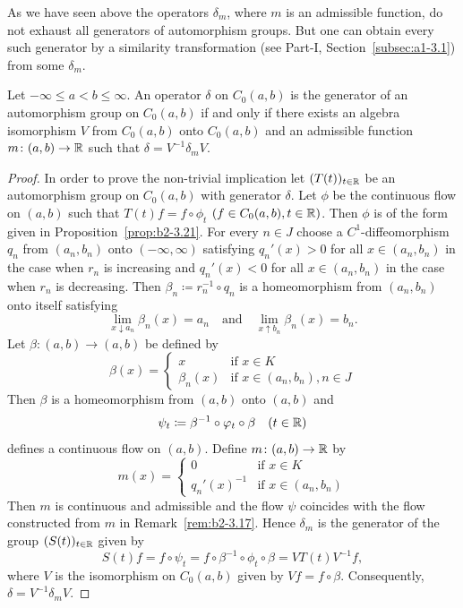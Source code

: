 As we have seen above the operators $\delta_{m}$, where $m$ is an admissible function, do not exhaust all generators of automorphism groups.
But one can obtain every such generator by a similarity transformation (see Part-I, Section~\ref{subsec:a1-3.1}) from some $\delta_{m}$.
\begin{theorem}\label{thm:b2-3.24}
%
Let $-\infty \leq a < b \leq \infty$.
An operator $\delta$ on $C_{0}(a,b)$ is the generator of an automorphism group on $C_{0}(a,b)$ if and only if there exists an algebra isomorphism $V$ from $C_{0}(a,b)$ onto $C_{0}(a,b)$ and an admissible function $m \colon (a,b) \to \mathbb{R}$ such that $\delta = V^{-1}\delta_{m}V$.
\end{theorem}
\begin{proof}
In order to prove the non-trivial implication let $(T(t))_{t \in \mathbb{R}}$ be an automorphism group on $C_{0}(a,b)$ with generator $\delta$.
Let $\phi$ be the continuous flow on $(a,b)$ such that $T(t)f = f \circ \phi_{t}$ $(f \in C_{0}(a,b), t \in \mathbb{R})$.
Then $\phi$ is of the form given in Proposition~\ref{prop:b2-3.21}.
For every $n \in J$ choose a $C^{1}$-diffeomorphism $q_{n}$ from $(a_{n},b_{n})$ onto $(-\infty,\infty)$ satisfying $q_{n}'(x) > 0$ for all $x \in (a_{n},b_{n})$ in the case when $r_{n}$ is increasing and $q_{n}'(x) < 0$ for all $x \in (a_{n},b_{n})$ in the case when $r_{n}$ is decreasing.
Then $\beta_{n} \coloneq r_{n}^{-1} \circ q_{n}$ is a homeomorphism from $(a_{n},b_{n})$ onto itself satisfying 
%
\[
	\lim_{x \downarrow a_{n}}\beta_{n}(x) = a_{n} \quad \text{and} \quad 
	\lim_{x \uparrow b_{n}}\beta_{n}(x) = b_{n} . 
\]
%
Let $\beta \colon (a,b) \to (a,b)$ be defined by
\begin{equation*}\label{eq:b2-beta}
\beta(x) = \begin{cases}
    x & \text{if } x \in K \\
    \beta_{n}(x) & \text{if } x \in (a_{n},b_{n}), n \in J
\end{cases}
\end{equation*}
Then $\beta$ is a homeomorphism from $(a,b)$ onto $(a,b)$ and 
\[
	\psi_{t} \coloneq \beta^{-1} \circ \phi_{t} \circ \beta \quad (t \in \R)
\]
%
defines a continuous flow on $(a,b)$.
Define $m \colon (a,b) \to \mathbb{R}$ by
\begin{equation*}\label{eq:b2-m-def2}
m(x) = \begin{cases}
    0 & \text{if } x \in K \\
    q_{n}'(x)^{-1} & \text{if } x \in (a_{n},b_{n})
\end{cases}
\end{equation*}
Then $m$ is continuous and admissible and the flow $\psi$ coincides with the flow constructed from $m$ in Remark~\ref{rem:b2-3.17}.
Hence $\delta_{m}$ is the generator of the group $(S(t))_{t \in \mathbb{R}}$ given by 
%
\[
	S(t)f = f \circ \psi_{t} = f \circ \beta^{-1} \circ \phi_{t} \circ \beta = VT(t)V^{-1}f ,
\]
%
where $V$ is the isomorphism on $C_{0}(a,b)$ given by $Vf = f \circ \beta$.
Consequently, $\delta = V^{-1}\delta_{m}V$.
\end{proof}
